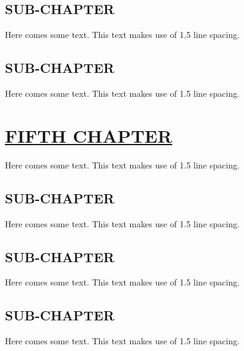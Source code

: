 \documentclass[fontsize=13pt]{scrartcl}
\begin{document}
{{{{{{{\subsection{SUB-CHAPTER}
Here comes some text. This text makes use of 1.5 line spacing. 
\subsection{SUB-CHAPTER}
Here comes some text. This text makes use of 1.5 line spacing. 
\pagebreak
\section{\uline{FIFTH CHAPTER}}
Here comes some text. This text makes use of 1.5 line spacing. 
\subsection{SUB-CHAPTER}
Here comes some text. This text makes use of 1.5 line spacing. 
\subsection{SUB-CHAPTER}
Here comes some text. This text makes use of 1.5 line spacing. 
\subsection{SUB-CHAPTER}
Here comes some text. This text makes use of 1.5 line spacing. 
\pagebreak
}}}}}}}
\end{document}
